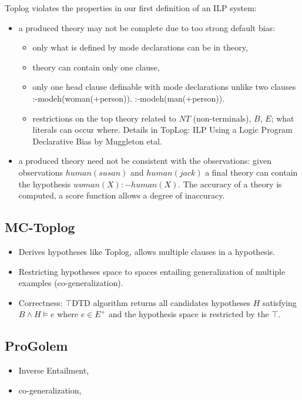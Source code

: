 Toplog violates the properties in our first definition of an ILP system:
\begin{itemize}
\item a produced theory may not be complete due to too strong default bias:
\begin{itemize}
\item only what is defined by mode declarations can be in theory,
\item theory can contain only one clause,
\item only one head clause definable with mode declarations unlike two clauses :-modeh(woman(+person)). :-modeh(man(+person)).
\item restrictions on the top theory related to $NT$ (non-terminals), $B$, $E$; what literals can occur where. Details in TopLog: ILP Using a Logic Program Declarative Bias by Muggleton etal.
\end{itemize}
\item a produced theory need not be consistent with the observations: given observations $human(susan)$ and $human(jack)$ a final theory can contain the hypothesis $woman(X) :- human(X)$. The accuracy of a theory is computed, a score function allows a degree of inaccuracy.
\end{itemize}

\subsection{MC-Toplog}
\begin{itemize}
\item Derives hypotheses like Toplog, allows multiple clauses in a hypothesis.
\item Restricting hypotheses space to spaces entailing generalization of multiple examples (co-generalization).
\item Correctness: $\top$DTD algorithm returns all candidates hypotheses $H$ satisfying $B \wedge H \models e$ where $e \in E^+$ and the hypothesis space is restricted by the $\top$.
\end{itemize}

\subsection{ProGolem}
\begin{itemize}
\item Inverse Entailment,
\item co-generalization, 
\end{itemize}

